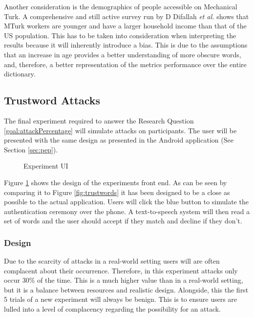 Another consideration is the demographics of people accessible on Mechanical Turk. A comprehensive and still active survey run by D Difallah \textit{et al.} \cite{difallah2018demographics} shows that MTurk workers are younger and have a larger household income than that of the US population. This has to be taken into consideration when interpreting the results because it will inherently introduce a bias. This is due to the assumptions that an increase in age provides a better understanding of more obscure words, and, therefore, a better representation of the metrics performance over the entire dictionary.

\newpage

\subsection{Trustword Attacks}

The final experiment required to answer the Research Question \ref{goal:attackPercentage} will simulate attacks on participants. The user will be presented with the same design as presented in the \pep Android application (See Section \ref{sec:pep}).

\begin{figure}[h!]
    \centering
    \caption{Experiment UI}
    \label{fig:expID}
\end{figure}

Figure \ref{fig:expID} shows the design of the experiments front end. As can be seen by comparing it to Figure \ref{fig:trustwords} it has been designed to be a close as possible to the actual application. Users will click the blue button to simulate the authentication ceremony over the phone. A text-to-speech system will then read a set of words and the user should accept if they match and decline if they don't.

\subsubsection{Design}

Due to the scarcity of attacks in a real-world setting users will are often complacent about their occurrence. Therefore, in this experiment attacks only occur 30\% of the time. This is a much higher value than in a real-world setting, but it is a balance between resources and realistic design. Alongside, this the first 5 trials of a new experiment will always be benign. This is to ensure users are lulled into a level of complacency regarding the possibility for an attack.

